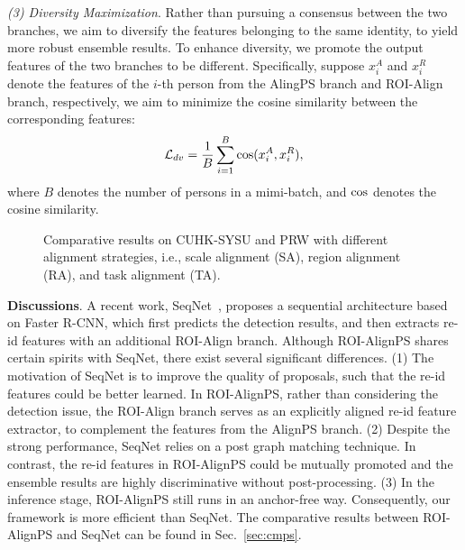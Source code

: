 \documentclass[journal]{IEEEtran}
\begin{document}
\textit{(3) Diversity Maximization}. Rather than pursuing a consensus between the two branches, we aim to diversify the features belonging to the same identity, to yield more robust ensemble results.
To enhance diversity, we promote the output features of the two branches to be different. Specifically, suppose $x_i^A$ and $x_i^R$ denote the features of the $i$-th person from the AlingPS branch and ROI-Align branch, respectively, we aim to minimize the cosine similarity between the corresponding features:
\begin{equation}
    \mathcal{L}_{dv} = \frac{1}{B}\sum_{i=1}^{B} {\rm cos}(x_i^A, x_i^R),
\end{equation}
where $B$ denotes the number of persons in a mimi-batch, and $\rm cos$ denotes the cosine similarity.


\begin{figure*}[t]
\centering
{}
\hspace{2mm}
\centering
{}
\caption{Comparative results on CUHK-SYSU and PRW with different alignment strategies, i.e., scale alignment (SA), region alignment (RA), and task alignment (TA).}
\label{fig:baseline}
\end{figure*}


\textbf{Discussions}. A recent work, SeqNet~\cite{DBLP:conf/aaai/LiM21}, proposes a sequential architecture based on Faster R-CNN, which first predicts the detection results, and then extracts re-id features with an additional ROI-Align branch. Although ROI-AlignPS shares certain spirits with SeqNet, there exist several significant differences. (1) The motivation of SeqNet is to improve the quality of proposals, such that the re-id features could be better learned. In ROI-AlignPS, rather than considering the detection issue, the ROI-Align branch serves as an explicitly aligned re-id feature extractor, to complement the features from the AlignPS branch. (2) Despite the strong performance, SeqNet relies on a post graph matching technique. In contrast, the re-id features in ROI-AlignPS could be mutually promoted and the ensemble results are highly discriminative without post-processing. (3) In the inference stage, ROI-AlignPS still runs in an anchor-free way. Consequently, our framework is more efficient than SeqNet. The comparative results between ROI-AlignPS and SeqNet can be found in Sec.~\ref{sec:cmps}. 
\end{document}
